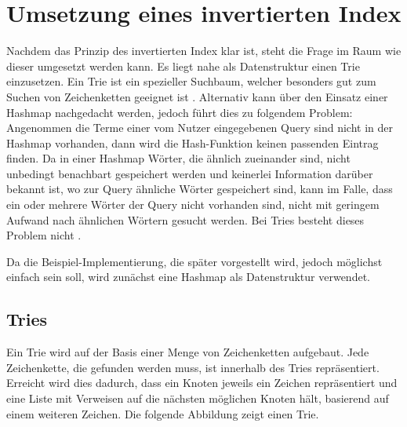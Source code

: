 \section{Umsetzung eines invertierten Index}
Nachdem das Prinzip des invertierten Index klar ist, steht die Frage im Raum wie dieser umgesetzt werden kann.
Es liegt nahe als Datenstruktur einen Trie einzusetzen. Ein Trie ist ein spezieller Suchbaum, welcher besonders gut zum Suchen von Zeichenketten geeignet ist \cite[S. 50 f.]{IR_Intro_Cambridge}.
\newline
Alternativ kann über den Einsatz einer Hashmap nachgedacht werden, jedoch führt dies zu folgendem Problem:
Angenommen die Terme einer vom Nutzer eingegebenen Query sind nicht in der Hashmap vorhanden, dann wird die Hash-Funktion keinen passenden Eintrag finden. Da in einer Hashmap Wörter, die ähnlich zueinander sind, nicht unbedingt benachbart gespeichert werden und keinerlei Information darüber bekannt ist, wo zur Query ähnliche Wörter gespeichert sind, kann im Falle, dass ein oder mehrere Wörter der Query nicht vorhanden sind, nicht mit geringem Aufwand nach ähnlichen Wörtern gesucht werden. Bei Tries besteht dieses Problem nicht \cite[S. 50]{IR_Intro_Cambridge}. 
\newline

Da die Beispiel-Implementierung, die später vorgestellt wird, jedoch möglichst einfach sein soll, wird zunächst eine Hashmap als Datenstruktur verwendet. 

\subsection{Tries}
Ein Trie wird auf der Basis einer Menge von Zeichenketten aufgebaut. Jede Zeichenkette, die gefunden werden muss, ist innerhalb des Tries repräsentiert.
\newline
Erreicht wird dies dadurch, dass ein Knoten jeweils ein Zeichen repräsentiert und eine Liste mit Verweisen auf die nächsten möglichen Knoten hält, basierend auf einem weiteren Zeichen.
Die folgende Abbildung zeigt einen Trie.

